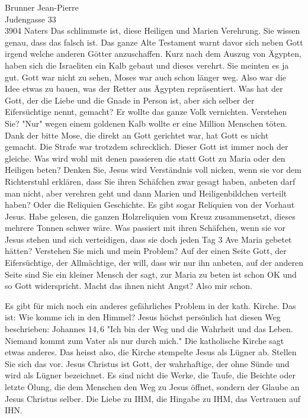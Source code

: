\documentclass[
    12pt,
    a4paper,
    letter,
    parskip=yes,
    ]{scrlttr2}
\begin{document}
\begin{letter}{
Brunner Jean-Pierre\\
Judengasse 33\\
3904 Naters}
Das schlimmste ist, diese Heiligen und Marien Verehrung. Sie wissen genau, dass das falsch ist. Das ganze Alte Testament warnt davor sich neben Gott irgend welche anderen Götter anzuschaffen. Kurz nach dem Auszug von Ägypten, haben sich die Israeliten ein Kalb gebaut und dieses verehrt. Sie meinten es ja gut. Gott war nicht zu sehen, Moses war auch schon länger weg. Also war die Idee etwas zu bauen, was der Retter aus Ägypten repräsentiert. Was hat der Gott, der die Liebe und die Gnade in Person ist, aber sich selber der Eifersüchtige nennt, gemacht? Er wollte das ganze Volk vernichten. Verstehen Sie? "Nur"{} wegen einem goldenen Kalb wollte er eine Million Menschen töten. Dank der bitte Mose, die direkt an Gott gerichtet war, hat Gott es nicht gemacht. Die Strafe war trotzdem schrecklich. Dieser Gott ist immer noch der gleiche. Was wird wohl mit denen passieren die statt Gott zu Maria oder den Heiligen beten? Denken Sie, Jesus wird Verständnis voll nicken, wenn sie vor dem Richterstuhl erklären, dass Sie ihren Schäfchen zwar gesagt haben, anbeten darf man nicht, aber verehren geht und dann Marien und Heiligenbildchen verteilt haben? Oder die Reliquien Geschichte. Es gibt sogar Reliquien von der Vorhaut Jesus. Habe gelesen, die ganzen Holzreliquien vom Kreuz zusammensetzt, dieses mehrere Tonnen schwer wäre. Was passiert mit ihren Schäfchen, wenn sie vor Jesus stehen und sich verteidigen, dass sie doch jeden Tag 3 Ave Maria gebetet hätten? Verstehen Sie mich und mein Problem? Auf der einen Seite Gott, der Eifersüchtige, der Allmächtige, der will, dass wir nur ihn anbeten, auf der anderen Seite sind Sie ein kleiner Mensch der sagt, zur Maria zu beten ist schon OK und so Gott widerspricht. Macht das ihnen nicht Angst? Also mir schon.

Es gibt für mich noch ein anderes gefährliches Problem in der kath. Kirche. Das ist: Wie komme ich in den Himmel? Jesus höchst persönlich hat diesen Weg beschrieben: Johannes 14,\,6 "Ich bin der Weg und die Wahrheit und das Leben. Niemand kommt zum Vater als nur durch mich." Die katholische Kirche sagt etwas anderes. Das heisst also, die Kirche stempelte Jesus als Lügner ab. Stellen Sie sich das vor. Jesus Christus ist Gott, der wahrhaftige, der ohne Sünde und wird als Lügner bezeichnet. Es sind nicht die Werke, die Taufe, die Beichte oder letzte Ölung, die dem Menschen den Weg zu Jesus öffnet, sondern der Glaube an Jesus Christus selber. Die Liebe zu IHM, die Hingabe zu IHM, das Vertrauen auf IHN.


\end{letter}
\end{document}
